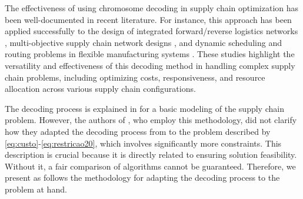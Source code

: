 \documentclass[sn-nature]{sn-jnl}%
\theoremstyle{thmstyleone}%
\theoremstyle{thmstyletwo}%
\theoremstyle{thmstylethree}%
\begin{document}


The effectiveness of using chromosome decoding in supply chain optimization has been well-documented in recent literature. 
For instance, this approach has been applied successfully to the design of integrated forward/reverse logistics networks \cite{pishvaee2010memetic}, 
multi-objective supply chain network designs \cite{altiparmak2006genetic}, and dynamic scheduling and routing problems in flexible manufacturing 
systems \cite{liu2023integrated}. These studies highlight the versatility and effectiveness of this decoding method in handling complex 
supply chain problems, including optimizing costs, responsiveness, and resource allocation across various supply chain configurations.

The decoding process is explained in \cite{gen2006genetic} for a basic modeling of the supply chain problem. However, the authors of \cite{rajabi2023utilizing}, who employ this methodology, did not clarify how they adapted the decoding process from \cite{gen2006genetic} to the problem described by \eqref{eq:custo}-\eqref{eq:restricao20}, which involves significantly more constraints. This description is crucial because it is directly related to ensuring solution feasibility. Without it, a fair comparison of algorithms cannot be guaranteed. Therefore, we present as follows the methodology for adapting the decoding process to the problem at hand.
\end{document}
